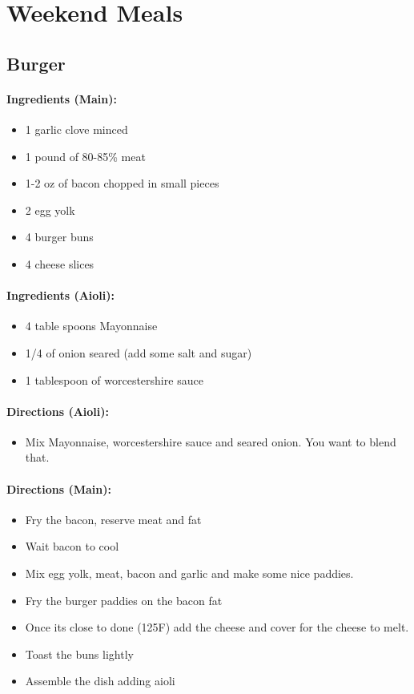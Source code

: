 \documentclass{article}
\begin{document}
\section{Weekend Meals}

\subsection{Burger}

\paragraph{Ingredients (Main):}
\begin{itemize}
	\item 1 garlic clove minced
	\item 1 pound of 80-85\% meat
	\item 1-2 oz of bacon chopped in small pieces
	\item 2 egg yolk
	\item 4 burger buns
	\item 4 cheese slices
\end{itemize}

\paragraph{Ingredients (Aioli):}
\begin{itemize}
	\item 4 table spoons Mayonnaise
	\item 1/4 of onion seared (add some salt and sugar)
	\item 1 tablespoon of worcestershire sauce
\end{itemize}


\paragraph{Directions (Aioli):}
\begin{itemize}
	\item Mix Mayonnaise, worcestershire sauce and seared onion. You want to blend that.
\end{itemize}

\paragraph{Directions (Main):}
\begin{itemize}
	\item Fry the bacon, reserve meat and fat
	\item Wait bacon to cool
	\item Mix egg yolk, meat, bacon and garlic and make some nice paddies.
	\item Fry the burger paddies on the bacon fat
	\item Once its close to done (125F) add the cheese and cover for the cheese to melt.
	\item Toast the buns lightly
	\item Assemble the dish adding aioli
\end{itemize}
\end{document}
